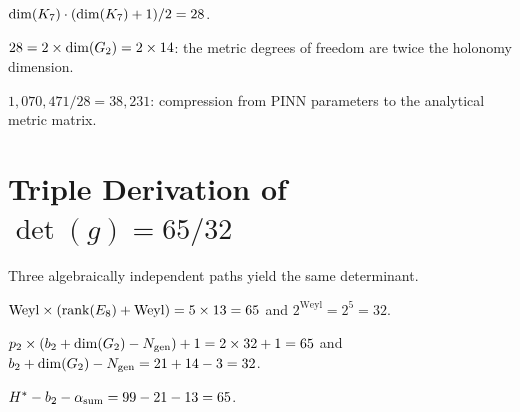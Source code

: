 \begin{theorem}\label{thm:spd7_formula}
    \leanok
    $\mathrm{dim}(K_7) \cdot (\mathrm{dim}(K_7) + 1) / 2 = 28$.
\end{theorem}

\begin{theorem}[SPD$_7$ = Twice Holonomy]\label{thm:spd7_twice_G2}
    \leanok
    $28 = 2 \times \mathrm{dim}(G_2) = 2 \times 14$: the metric degrees of freedom
    are twice the holonomy dimension.
\end{theorem}

\begin{theorem}\label{thm:compression}
    \leanok
    $1{,}070{,}471 / 28 = 38{,}231$: compression from PINN parameters
    to the analytical metric matrix.
\end{theorem}

\section{Triple Derivation of \texorpdfstring{$\det(g) = 65/32$}{det(g) = 65/32}}

Three algebraically independent paths yield the same determinant.

\begin{theorem}\label{thm:detg_weyl}
    \leanok
    $\mathrm{Weyl} \times (\mathrm{rank}(E_8) + \mathrm{Weyl}) = 5 \times 13 = 65$
    and $2^{\mathrm{Weyl}} = 2^5 = 32$.
\end{theorem}

\begin{theorem}\label{thm:detg_cohom}
    \leanok
    $p_2 \times (b_2 + \mathrm{dim}(G_2) - N_{\mathrm{gen}}) + 1 = 2 \times 32 + 1 = 65$
    and $b_2 + \mathrm{dim}(G_2) - N_{\mathrm{gen}} = 21 + 14 - 3 = 32$.
\end{theorem}

\begin{theorem}\label{thm:detg_Hstar}
    \leanok
    $H^* - b_2 - \alpha_{\mathrm{sum}} = 99 - 21 - 13 = 65$.
\end{theorem}

